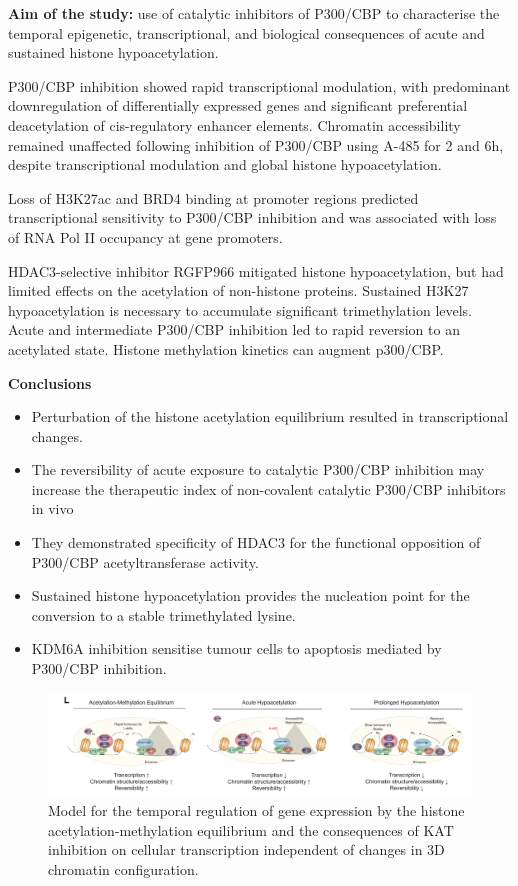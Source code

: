 \textbf{Aim of the study:} use of catalytic inhibitors of P300/CBP to characterise the temporal epigenetic, transcriptional, and biological consequences of acute and sustained histone hypoacetylation.

P300/CBP inhibition showed rapid transcriptional modulation, with predominant downregulation of differentially expressed genes and significant preferential deacetylation of cis-regulatory enhancer elements. Chromatin accessibility remained unaffected following inhibition of P300/CBP using A-485 for 2 and 6h, despite transcriptional modulation and global histone hypoacetylation. 

Loss of H3K27ac and BRD4 binding at promoter regions predicted transcriptional sensitivity to P300/CBP inhibition and was associated with loss of RNA Pol II occupancy at gene promoters.

HDAC3-selective inhibitor RGFP966 mitigated histone hypoacetylation, but had limited effects on the acetylation of non-histone proteins.
Sustained H3K27 hypoacetylation is necessary to accumulate significant trimethylation levels. Acute and intermediate P300/CBP inhibition led to rapid reversion to an acetylated state. Histone methylation kinetics can augment p300/CBP.

\textbf{Conclusions}
\begin{itemize}
\item Perturbation of the histone acetylation equilibrium resulted in transcriptional changes.
\item The reversibility of acute exposure to catalytic P300/CBP inhibition may increase the therapeutic index of non-covalent catalytic P300/CBP inhibitors in vivo
\item They demonstrated specificity of HDAC3 for the functional opposition of P300/CBP acetyltransferase activity.
\item Sustained histone hypoacetylation provides the nucleation point for the conversion to a stable trimethylated lysine.
\item KDM6A inhibition sensitise tumour cells to apoptosis mediated by P300/CBP inhibition.
\end{itemize}

\begin{figure}
\centering
\includegraphics[width=\textwidth]{../_resources/Screen_Shot_2022-12-20_at_12-01-08.png}
\caption{Model for the temporal regulation of gene expression by the histone acetylation-methylation equilibrium and the consequences of KAT inhibition on cellular transcription independent of changes in 3D chromatin configuration.}
\end{figure}

